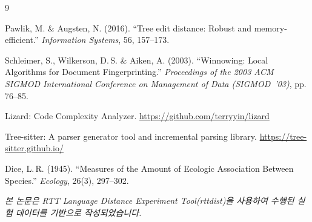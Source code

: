 \begin{thebibliography}{9}

  Pawlik, M. \& Augsten, N. (2016).
  ``Tree edit distance: Robust and memory-efficient.''
  \textit{Information Systems}, 56, 157--173.

  Schleimer, S., Wilkerson, D.\,S. \& Aiken, A. (2003).
  ``Winnowing: Local Algorithms for Document Fingerprinting.''
  \textit{Proceedings of the 2003 ACM SIGMOD International Conference on Management of Data (SIGMOD~'03)},
  pp.\,76--85.

  Lizard: Code Complexity Analyzer.
  \url{https://github.com/terryyin/lizard}

  Tree-sitter: A parser generator tool and incremental parsing library.
  \url{https://tree-sitter.github.io/}

  Dice, L.\,R. (1945).
  ``Measures of the Amount of Ecologic Association Between Species.''
  \textit{Ecology}, 26(3), 297--302.

\end{thebibliography}

\vspace{2em}
\noindent\small
\textit{본 논문은 RTT Language Distance Experiment Tool(rttdist)을 사용하여
수행된 실험 데이터를 기반으로 작성되었습니다.}
